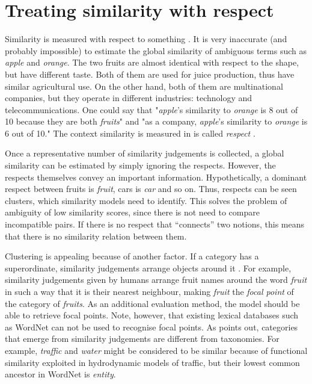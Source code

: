 \documentclass[11pt]{article}
\begin{document}
\section{Treating similarity with respect}


Similarity is measured with respect to something \cite{Roth1983346,Sadler1993}. It is very inaccurate (and probably impossible) to estimate the global similarity of ambiguous terms such as \textit{apple} and \textit{orange}. The two fruits are almost identical with respect to the shape, but have different taste. Both of them are used for juice production, thus have similar agricultural use. On the other hand, both of them are multinational companies, but they operate in different industries: technology and telecommunications. One could say that "\textit{apple}'s similarity to \textit{orange} is 8 out of 10 because they are both \textit{fruits}" and "as a company, \textit{apple}'s similarity to \textit{orange} is 6 out of 10." The context similarity is measured in is called \emph{respect} \cite{hahn1997concepts}.

Once a representative number of similarity judgements is collected, a global similarity can be estimated by simply ignoring the respects. However, the respects themselves convey an important information. Hypothetically, a dominant respect between fruits is \textit{fruit}, cars is \textit{car} and so on. Thus, respects can be seen clusters, which similarity models need to identify. This solves the problem of ambiguity of low similarity scores, since there is not need to compare incompatible pairs. If there is no respect that ``connects'' two notions, this means that there is no similarity relation between them.

Clustering is appealing because of another factor. If a category has a superordinate, similarity judgements arrange objects around it \cite{1986-13502-00119860101}. For example, similarity judgements given by humans arrange fruit names around the word \textit{fruit} in such a way that it is their nearest neighbour, making \textit{fruit} the \emph{focal point} of the category of \textit{fruits}. As an additional evaluation method, the model should be able to retrieve focal points. Note, however, that existing lexical databases such as WordNet \cite{Miller:1995:WLD:219717.219748} can not be used to recognise focal points. As  points out, categories that emerge from similarity judgements are different from taxonomies. For example, \textit{traffic} and \textit{water} might be considered to be similar because of functional similarity exploited in hydrodynamic models of traffic, but their lowest common ancestor in WordNet is \textit{entity}.
\end{document}
